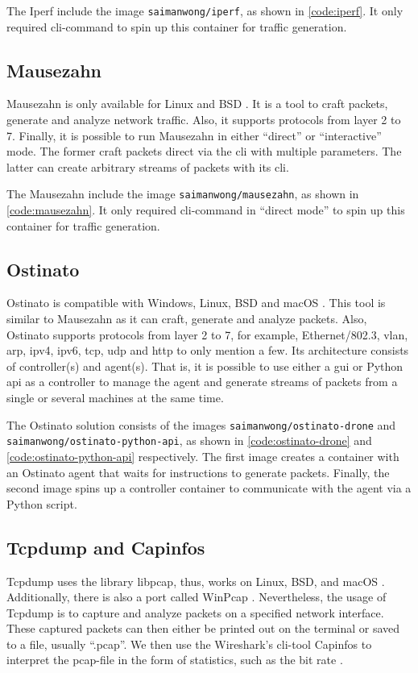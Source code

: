 \skippara The Iperf include the image \texttt{saimanwong/iperf}, as shown in \cref{code:iperf}.
It only required \gls{cli}-command to spin up this container for traffic generation.

\clearpage
\subsection{Mausezahn}
Mausezahn is only available for Linux and BSD \cite{netsniff7:online, UbuntuMa4:online}.
It is a tool to craft packets, generate and analyze network traffic.
Also, it supports protocols from layer 2 to 7.
Finally, it is possible to run Mausezahn in either ``direct'' or ``interactive'' mode.
The former craft packets direct via the \gls{cli} with multiple parameters.
The latter can create arbitrary streams of packets with its \gls{cli}.

\skippara The Mausezahn include the image \texttt{saimanwong/mausezahn}, as shown in \cref{code:mausezahn}.
It only required \gls{cli}-command in ``direct mode'' to spin up this container for traffic generation.


\subsection{Ostinato}
Ostinato is compatible with Windows, Linux, BSD and macOS \cite{Ostinato63:online, pstavirs92:online}.
This tool is similar to Mausezahn as it can craft, generate and analyze packets.
Also, Ostinato supports protocols from layer 2 to 7, for example, Ethernet/802.3, \acrshort{vlan}, \acrshort{arp}, \acrshort{ipv4}, \acrshort{ipv6}, \acrshort{tcp}, \acrshort{udp} and \acrshort{http} to only mention a few.
Its architecture consists of controller(s) and agent(s).
That is, it is possible to use either a \acrshort{gui} or Python \gls{api} as a controller to manage the agent and generate streams of packets from a single or several machines at the same time.

\skippara The Ostinato solution consists of the images \texttt{saimanwong/ostinato-drone} and \texttt{saimanwong/ostinato-python-api}, as shown in \cref{code:ostinato-drone} and \cref{code:ostinato-python-api} respectively.
The first image creates a container with an Ostinato agent that waits for instructions to generate packets.
Finally, the second image spins up a controller container to communicate with the agent via a Python script.

\subsection{Tcpdump and Capinfos}
Tcpdump uses the library libpcap, thus, works on Linux, BSD, and macOS \cite{TCPDUMPL66:online}.
Additionally, there is also a port called WinPcap \cite{WinPcapH61:online}.
Nevertheless, the usage of Tcpdump is to capture and analyze packets on a specified network interface.
These captured packets can then either be printed out on the terminal or saved to a file, usually ``.pcap''.
We then use the Wireshark's \gls{cli}-tool Capinfos to interpret the pcap-file in the form of statistics, such as the bit rate \cite{ToolsThe22:online}.

